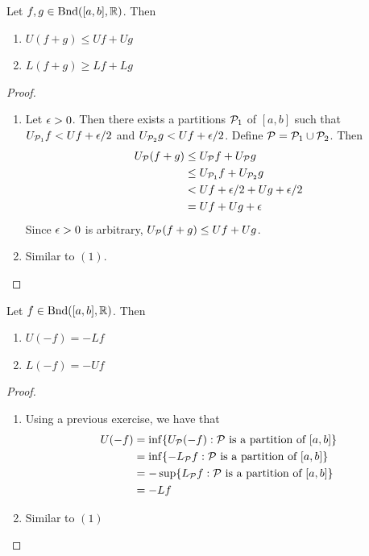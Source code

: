 \documentclass{book}
\begin{document}
	\begin{ex}  
		Let $f, g \in \text{Bnd}([a,b], \mathbb{R})$. Then 
		\begin{enumerate}
			\item $U(f+g) \leq U f + U g$
			\item $L(f+g) \geq L f + L g$
		\end{enumerate}
	\end{ex}

	\begin{proof}\
		\begin{enumerate}
			\item Let $\epsilon >0$. Then there exists a partitions $\mathcal{P}_1$ of $[a,b]$ such that $U_{\mathcal{P}_1} f < U f + \epsilon/2$ and $U_{\mathcal{P}_2} g < U f + \epsilon/2$. Define $\mathcal{P} = \mathcal{P}_1 \cup \mathcal{P}_2$. Then 
			\begin{align*}
				U_{\mathcal{P}}(f +g) 
				&\leq U_{\mathcal{P}} f + U_{\mathcal{P}} g \\
				&\leq U_{\mathcal{P}_1} f + U_{\mathcal{P}_2} g \\
				&< U f + \epsilon/2 +  U g + \epsilon/2 \\
				&= Uf + Ug + \epsilon
			\end{align*}
			Since $\epsilon >0$ is arbitrary, $U_{\mathcal{P}}(f +g)  \leq Uf + Ug$.
			\item Similar to $(1)$.
		\end{enumerate}
	\end{proof}

	\begin{ex}  
		Let $f \in \text{Bnd}([a,b], \mathbb{R})$. Then 
		\begin{enumerate}
			\item $U(-f) = -Lf$
			\item $L(-f) = -Uf$
		\end{enumerate}
	\end{ex}

	\begin{proof} \
		\begin{enumerate}
			\item Using a previous exercise, we have that
			\begin{align*}
				U(-f)
				&= \inf \{U_{\mathcal{P}}(-f): \mathcal{P} \text{ is a partition of } [a,b]\} \\
				&= \inf \{ -L_{\mathcal{P}} f: \mathcal{P} \text{ is a partition of } [a,b]\} \\
				&= - \sup \{L_{\mathcal{P}} f: \mathcal{P} \text{ is a partition of } [a,b]\} \\
				&= - Lf
			\end{align*}
			\item Similar to $(1)$
		\end{enumerate}
	\end{proof}
\end{document}
